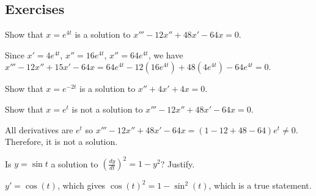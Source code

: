 %



\subsection{Exercises}

\noindent


\begin{exercise}
Show that $x = e^{4t}$ is a solution to $x'''-12 x'' + 48 x' - 64 x = 0$.
\end{exercise}
\comboSol{%
}
{%
Since $x' = 4e^{4t}$, $x'' = 16e^{4t}$, $x'' = 64e^{4t}$, we have
$x''' - 12x'' + 15x' - 64x = 64e^{4t} - 12(16e^{4t}) + 48(4e^{4t}) - 64e^{4t} = 0$.
}

\begin{exercise}\ansMark%
Show that $x = e^{-2t}$ is a solution to $x'' + 4x' + 4x = 0$.
\end{exercise}

\begin{exercise}
Show that $x = e^{t}$ is not a solution to $x'''-12 x'' + 48 x' - 64 x = 0$.
\end{exercise}
\comboSol{%
}
{%
All derivatives are $e^t$ so
$x''' - 12x'' + 48x' - 64x = (1 - 12 + 48 - 64)e^t \neq 0$. Therefore, it is not a solution.
}

\begin{exercise}
Is $y = \sin t$ a solution to ${\left( \frac{dy}{dt} \right)}^2 = 1 - y^2$?
Justify.
\end{exercise}
\comboSol{%
}
{%
$y' = \cos(t)$, which gives $\cos(t)^2 = 1 - \sin^2(t)$, which is a true statement. 
}

